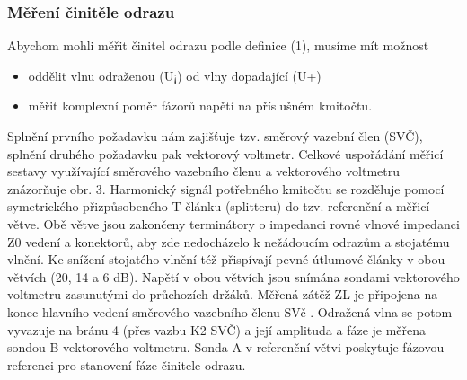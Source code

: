       \subsubsection{Měření činitěle odrazu} 
        Abychom mohli měřit činitel odrazu podle definice (1), musíme mít možnost
        \begin{itemize}
          \item oddělit vlnu odraženou (U¡) od vlny dopadající (U+)
          \item měřit komplexní poměr fázorů napětí na příslušném kmitočtu.
        \end{itemize} 
        
        Splnění prvního požadavku nám zajišťuje tzv. směrový vazební člen (SVČ), splnění druhého 
        požadavku pak vektorový voltmetr. Celkové uspořádání měřicí sestavy využívající směrového 
        vazebního členu a vektorového voltmetru znázorňuje obr. 3. Harmonický signál potřebného 
        kmitočtu se rozděluje pomocí symetrického přizpůsobeného T-článku (splitteru) do tzv. 
        referenční a měřicí větve. Obě větve jsou zakončeny terminátory o impedanci rovné vlnové 
        impedanci Z0 vedení a konektorů, aby zde nedocházelo k nežádoucím odrazům a stojatému 
        vlnění. Ke snížení stojatého vlnění též přispívají pevné útlumové články v obou větvích 
        (20, 14 a 6 dB). Napětí v obou větvích jsou snímána sondami vektorového voltmetru 
        zasunutými do průchozích držáků. Měřená zátěž ZL je připojena na konec hlavního vedení 
        směrového vazebního členu SVč . Odražená vlna se potom vyvazuje na bránu 4 (přes vazbu K2 
        SVČ) a její amplituda a fáze je měřena sondou B vektorového voltmetru. Sonda A v referenční 
        větvi poskytuje fázovou referenci pro stanovení fáze činitele odrazu.
  
